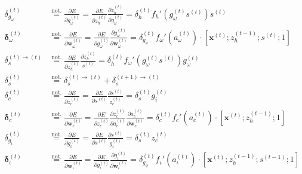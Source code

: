 \documentclass[11pt]{article}
\begin{document}
\begin{align}
    \delta_{g_{\omega}}^{(t)} &\overset{\text{not.}}{=} \displaystyle \frac{\partial E}{\partial g_{\omega}^{(t)}} = \displaystyle \frac{\partial E}{\partial z_{h}^{(t)}} \displaystyle \frac{\partial z_h^{(t)}}{\partial g_{\omega}^{(t)}} = \delta_h^{(t)}f_h'\left(g_{\omega}^{(t)}s^{(t)}\right)s^{(t)} \\
    \boldsymbol{\delta}_{\omega}^{(t)} &\overset{\text{not.}}{=} \displaystyle \frac{\partial E}{\partial \boldsymbol{w}_{\omega}^{(t)}} = \displaystyle \frac{\partial E}{\partial g_{\omega}^{(t)}} \displaystyle \frac{\partial g_{\omega}^{(t)}}{\partial \boldsymbol{w}_{\omega}^{(t)}} = \delta_{g_{\omega}}^{(t)} f_{\omega}'\left(a_{\omega}^{(t)}\right) \cdot \left[\mathbf{x}^{(t)}; z_{h}^{(t-1)}; s^{(t)}; 1\right] \\
    \delta_s^{(t)\rightarrow(t)} &\overset{\text{not.}}{=} \displaystyle \frac{\partial E}{\partial z_h^{(t)}}  \displaystyle \frac{\partial z_h^{(t)}}{s^{(t)}} = \delta_{h}^{(t)} f_{\omega}'\left(g_{\omega}^{(t)}s^{(t)}\right) g_{\omega}^{(t)} \\
    \delta_s^{(t)} &\overset{\text{not.}}{=} \delta^{(t) \rightarrow (t)}_s + \delta^{(t+1) \rightarrow (t)}_s \\
    \delta_c^{(t)} &\overset{\text{not.}}{=} \displaystyle \frac{\partial E}{\partial z_c^{(t)}} = \displaystyle \frac{\partial E}{\partial s^{(t)}}  \displaystyle \frac{\partial s^{(t)}}{z_c^{(t)}} = \delta_s^{(t)} g_i^{(t)} \\
    \boldsymbol{\delta}_{c}^{(t)} &\overset{\text{not.}}{=}  \displaystyle \frac{\partial E}{\partial \boldsymbol{w}_{c}^{(t)}} = \displaystyle \frac{\partial E}{\partial z_c^{(t)}} \displaystyle \frac{\partial z_c^{(t)}} {\partial a_c^{(t)}}
\frac{\partial a_c^{(t)}} {\partial \boldsymbol{w}_c^{(t)}}       
    =  \delta_c^{(t)} f_{c}'\left(a_{c}^{(t)}\right)  \cdot \left[\mathbf{x}^{(t)}; z_{h}^{(t-1)}; 1\right]\\
    \delta_{g_{\iota}}^{(t)} &\overset{\text{not.}}{=} \displaystyle \frac{\partial E}{\partial g_{\iota}^{(t)}} = \displaystyle \frac{\partial E}{\partial s^{(t)}}  \displaystyle \frac{\partial s^{(t)}}{g_{\iota}^{(t)}} = \delta_s^{(t)} z_c^{(t)} \\
    \boldsymbol{\delta}_{\iota}^{(t)} &\overset{\text{not.}}{=} \displaystyle \frac{\partial E}{\partial \boldsymbol{w}_{\iota}^{(t)}} = \displaystyle \frac{\partial E}{\partial g_{\iota}^{(t)}} \displaystyle \frac{\partial g_{\iota}^{(t)}}{\partial \boldsymbol{w}_{\iota}^{(t)}} = \delta_{g_{\phi}}^{(t)} f_{\iota}'\left(a_{\iota}^{(t)}\right) \cdot \left[\mathbf{x}^{(t)}; z_{h}^{(t-1)}; s^{(t-1)}; 1\right] \\

\end{align}
\end{document}
